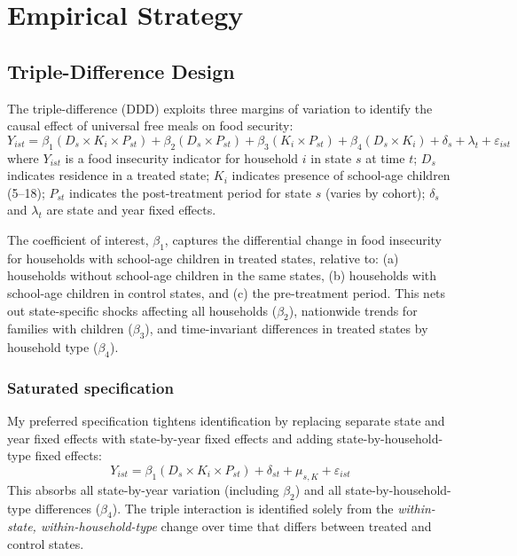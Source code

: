 \documentclass[12pt]{article}
\begin{document}



\section{Empirical Strategy}
\label{sec:strategy}

\subsection{Triple-Difference Design}

The triple-difference (DDD) exploits three margins of variation to identify the causal effect of universal free meals on food security:
\begin{equation}
\label{eq:ddd}
Y_{ist} = \beta_1 (D_s \times K_i \times P_{st}) + \beta_2 (D_s \times P_{st}) + \beta_3 (K_i \times P_{st}) + \beta_4 (D_s \times K_i) + \delta_s + \lambda_t + \varepsilon_{ist}
\end{equation}
where $Y_{ist}$ is a food insecurity indicator for household $i$ in state $s$ at time $t$; $D_s$ indicates residence in a treated state; $K_i$ indicates presence of school-age children (5--18); $P_{st}$ indicates the post-treatment period for state $s$ (varies by cohort); $\delta_s$ and $\lambda_t$ are state and year fixed effects.

The coefficient of interest, $\beta_1$, captures the differential change in food insecurity for households with school-age children in treated states, relative to: (a) households without school-age children in the same states, (b) households with school-age children in control states, and (c) the pre-treatment period. This nets out state-specific shocks affecting all households ($\beta_2$), nationwide trends for families with children ($\beta_3$), and time-invariant differences in treated states by household type ($\beta_4$).

\subsubsection*{Saturated specification} My preferred specification tightens identification by replacing separate state and year fixed effects with state-by-year fixed effects and adding state-by-household-type fixed effects:
\begin{equation}
\label{eq:ddd_sat}
Y_{ist} = \beta_1 (D_s \times K_i \times P_{st}) + \delta_{st} + \mu_{s,K} + \varepsilon_{ist}
\end{equation}
This absorbs all state-by-year variation (including $\beta_2$) and all state-by-household-type differences ($\beta_4$). The triple interaction is identified solely from the \emph{within-state, within-household-type} change over time that differs between treated and control states.
\end{document}
